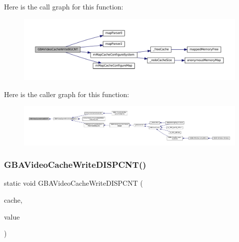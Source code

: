 Here is the call graph for this function\+:
\nopagebreak
\begin{figure}[H]
\begin{center}
\leavevmode
\includegraphics[width=350pt]{gba_2renderers_2cache-set_8c_a1299d4a8657975bf62ba1d6e26410a7d_cgraph}
\end{center}
\end{figure}
Here is the caller graph for this function\+:
\nopagebreak
\begin{figure}[H]
\begin{center}
\leavevmode
\includegraphics[width=350pt]{gba_2renderers_2cache-set_8c_a1299d4a8657975bf62ba1d6e26410a7d_icgraph}
\end{center}
\end{figure}
\mbox{\label{gba_2renderers_2cache-set_8c_ac92c0800c27ae258899fe58d4d279f78}} 
\subsubsection{\texorpdfstring{G\+B\+A\+Video\+Cache\+Write\+D\+I\+S\+P\+C\+N\+T()}{GBAVideoCacheWriteDISPCNT()}}
{\footnotesize\ttfamily static void G\+B\+A\+Video\+Cache\+Write\+D\+I\+S\+P\+C\+NT (\begin{DoxyParamCaption}\item[{struct m\+Cache\+Set $\ast$}]{cache,  }\item[{uint16\+\_\+t}]{value }\end{DoxyParamCaption})\hspace{0.3cm}{\ttfamily [static]}}

